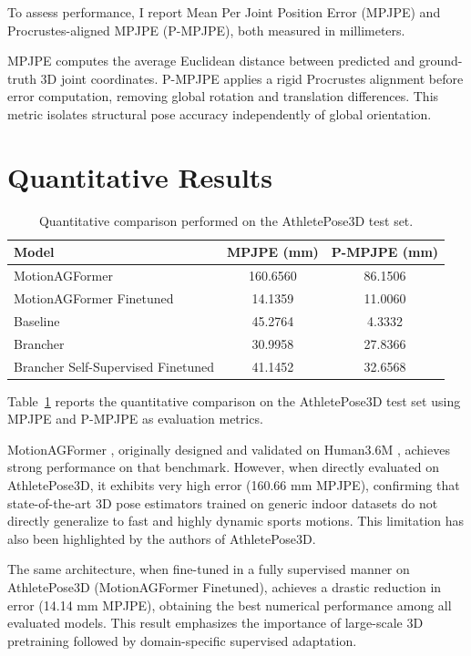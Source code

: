 To assess performance, I report Mean Per Joint Position Error (MPJPE) and Procrustes-aligned MPJPE (P-MPJPE), both measured in millimeters.

MPJPE computes the average Euclidean distance between predicted and ground-truth 3D joint coordinates. P-MPJPE applies a rigid Procrustes alignment before error computation, removing global rotation and translation differences. 
This metric isolates structural pose accuracy independently of global orientation.


\section{Quantitative Results}
\begin{table}[H]
\centering
\caption{Quantitative comparison performed on the AthletePose3D test set.}
\label{tab:results}
\begin{tabular}{lcc}
\hline
Model & MPJPE (mm) & P-MPJPE (mm) \\
\hline
MotionAGFormer & 160.6560 & 86.1506 \\
MotionAGFormer Finetuned & 14.1359 & 11.0060 \\
Baseline & 45.2764 & 4.3332 \\
Brancher & 30.9958 & 27.8366 \\
Brancher Self-Supervised Finetuned & 41.1452 & 32.6568 \\
\hline
\end{tabular}
\end{table}

Table~\ref{tab:results} reports the quantitative comparison on the AthletePose3D test set using MPJPE and P-MPJPE as evaluation metrics.

MotionAGFormer \cite{mehraban2024motionagformer}, originally designed and validated on Human3.6M \cite{ionescu2013human3}, achieves strong performance on that benchmark. However, when directly evaluated on AthletePose3D, it exhibits very high error (160.66 mm MPJPE), confirming that state-of-the-art 3D pose estimators trained on generic indoor datasets do not directly generalize to fast and highly dynamic sports motions. This limitation has also been highlighted by the authors of AthletePose3D.

The same architecture, when fine-tuned in a fully supervised manner on AthletePose3D (MotionAGFormer Finetuned), achieves a drastic reduction in error (14.14 mm MPJPE), obtaining the best numerical performance among all evaluated models. This result emphasizes the importance of large-scale 3D pretraining followed by domain-specific supervised adaptation.

